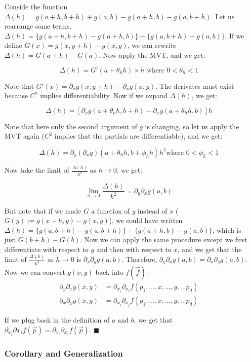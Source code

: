 \documentclass [12 pt, twoside] {book}
\newcommand\+{\text{ }}
\begin{document}
Conside the function $\Delta(h) = g(a + h, b + h) + g(a, b) - g(a + h, b) - g(a,
b + h)$. Let us rearrange some terms, $\Delta(h) = \{g(a + h, b + h) - g(a + h,
b)\} - \{g(a, b + h) - g(a, b)\}$. If we define $G(x) = g(x, y+h) - g(x, y)$, we can
rewrite $\Delta(h) = G(a+h) - G(a)$. Now apply the MVT, and we get:

$$\Delta(h) = G'(a + \theta_h h) \times h \text{        where } 0 < \theta_h < 1$$

Note that $G'(x) = \partial_x g(x, y+h) - \partial_x g(x, y)$. The derivates
must exist because $C^2$ implies differentiability. Now if we expand $\Delta(h)$, we
get:

$$\Delta(h) = [\partial_{x} g(a + \theta_h h, b + h) - \partial_{x} g(a + \theta_hh,
b)] h$$

Note that here only the second argument of $g$ is changing, so let us apply the MVT again ($C^2$
implies that the partials are differentiable), and we get:

$$\Delta(h) = \partial_{y} (\partial_{x} g) (a + \theta_h h, b + \phi_h h)h^2 \text{
where } 0 < \phi_h < 1$$

Now take the limit of $\frac{\Delta(h)}{h^2}$ as $h \to 0$, we get:

$$\lim_{h\to0} \frac{\Delta(h)}{h^2} = \partial_{y} \partial_{x} g(a, b)$$

But note that if we made $G$ a function of $y$ instead of $x$ ($G(y) := g(x + h,
y) - g(x, y)$), we could have written $\Delta(h) = \{g(a, b+h) - g(a, b+h)\} -
\{g(a + h, b) - g(a, b)\}$, which is just $G(b + h) - G(b)$. Now we can
apply the same procedure except we first differentiate with respect to $y$ and
then with respect to $x$, and we get that the limit of $\frac{\Delta(h)}{h^2}$
as $h \to 0$ is $\partial_{x} \partial_{y} g(a, b)$. Therefore,
$\partial_{y} \partial_{x} g(a, b) = \partial_{x} \partial_{y} g(a,
b)$. Now we can convert $g(x, y)$ back into $f(\vec{f})$:
\begin{align*}
    \partial_y \partial_x g(x, y) &= \partial_{x_j}\partial_{x_i} f(p_1,
    \dots, x, \dots, y, \dots p_d)\\
    \partial_x \partial_y g(x, y) &= \partial_{x_i}\partial_{x_j} f(p_1, \dots, x, \dots, y, \dots p_d)
\end{align*}

If we plug back in the definition of $a$ and $b$, we get that $\partial_{x_j}
\partial{x_i} f(\vec{p}) = \partial_{x_i}\partial_{x_j} f(\vec{p})$. $\blacksquare$


\subsubsection{Corollary and Generalization}
\end{document}
